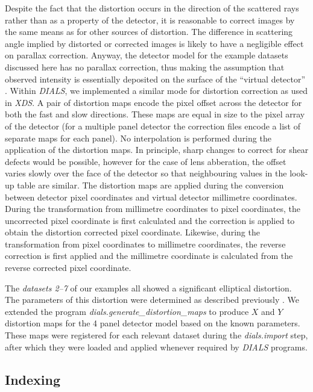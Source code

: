 \documentclass[preprint]{iucr}
\newcommand{\dials}{\emph{DIALS}\xspace}
\newcommand{\dialsimport}{\emph{dials.import}\xspace}
\newcommand{\xds}{\emph{XDS}\xspace}
\begin{document}
Despite the fact that the distortion occurs in the direction of the scattered
rays rather than as a property of the detector,
it is reasonable to correct images by the same means as for other sources of
distortion. The difference in scattering angle implied by distorted or corrected
images is likely to have a negligible effect
on parallax correction. Anyway, the detector model for the example datasets
discussed here has no parallax correction, thus making the assumption that
observed intensity is essentially deposited on the surface of the ``virtual
detector'' \cite{Parkhurst2014}. Within \dials, we implemented a similar mode
for distortion correction as used in \xds. A pair of distortion maps encode the
pixel offset across the detector for both the fast and slow directions. These
maps are equal in size to the pixel array of the detector (for a multiple panel
detector the correction files encode a list of separate maps for each panel).
No interpolation is performed during the application of the distortion maps. In
principle, sharp changes to correct for shear defects would be possible,
however for the case of lens abberation, the offset varies slowly over the face
of the detector so that neighbouring values in the look-up table are similar.
The distortion maps are applied during the conversion between detector pixel
coordinates and virtual detector millimetre coordinates. During the
transformation from millimetre coordinates to pixel coordinates, the
uncorrected pixel coordinate is first calculated and the correction is applied
to obtain the distortion corrected pixel coordinate. Likewise, during the
transformation from pixel coordinates to millimetre coordinates, the reverse
correction is first applied and the millimetre coordinate is calculated from
the reverse corrected pixel coordinate.

The \emph{datasets 2--7} of our examples all showed a significant elliptical
distortion. The parameters of this distortion were determined as described
previously \cite{Clabbers2017}. We extended the program
\emph{dials.generate\_distortion\_maps}
to produce $X$ and $Y$ distortion maps for the 4 panel detector model based on
the known parameters. These maps were registered for each relevant dataset
during the \dialsimport step, after which they were loaded and applied
whenever required by \dials programs.

\subsection{Indexing}
\end{document}
